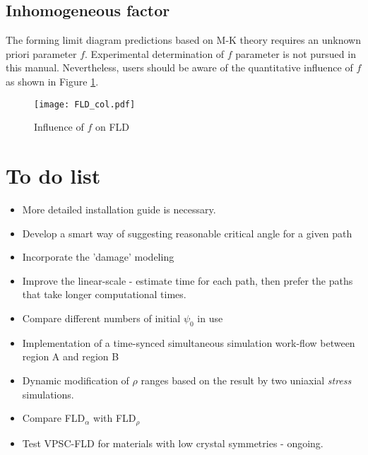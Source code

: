 \documentclass[12pt]{amsart}
\begin{document}
\subsection{Inhomogeneous factor}
\label{sec:inhomo}
The forming limit diagram predictions based on M-K theory requires an unknown priori parameter $f$.
Experimental determination of $f$ parameter is not pursued in this manual.
Nevertheless, users should be aware of the quantitative influence of $f$ as shown in Figure \ref{fig:fld_f_sens}.
\begin{figure}
  \texttt{[image: FLD\_col.pdf]}
  \caption{Influence of $f$ on FLD}
  \label{fig:fld_f_sens}
\end{figure}

\newpage
\section{To do list}
\begin{itemize}
\item More detailed installation guide is necessary.
\item Develop a smart way of suggesting reasonable critical angle for a given path
\item Incorporate the 'damage' modeling
\item Improve the linear-scale - estimate time for each path, then prefer the paths that take longer computational times.
\item Compare different numbers of initial $\psi_0$ in use
\item Implementation of a time-synced simultaneous simulation work-flow between region A and region B
\item Dynamic modification of $\rho$ ranges based on the result by two uniaxial \emph{stress} simulations.
\item Compare FLD$_\alpha$ with FLD$_\rho$
\item Test VPSC-FLD for materials with low crystal symmetries - ongoing.
\end{itemize}
\newpage
\end{document}
